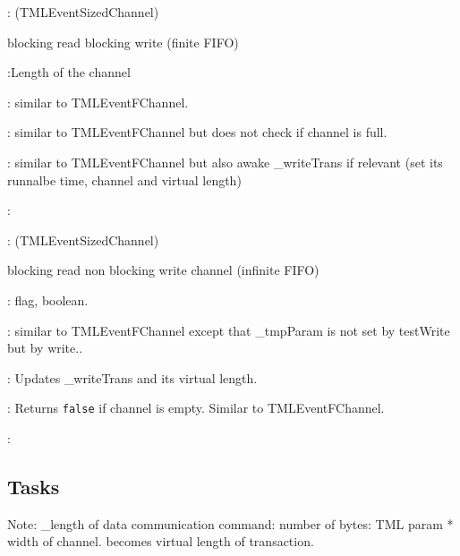 \documentclass[a4paper,11pt]{article}
\newcommand{\bfont}{\fontseries{b}\selectfont}
\newcommand{\cod}[1]{{\ttfamily #1}}
\newcommand{\class}[2]{\par\vspace{1mm}\hspace{-5mm}\large\colorbox{file}{\textbullet\bfont\cod{#1}:} (\cod{#2})\par}
\newcommand{\method}[1]{\par\vspace{1mm}\hspace{-2mm}\colorbox{method}{\textopenbullet\bfont\cod{#1}:}}
\newcommand{\variable}[1]{\par\vspace{1mm}\hspace{-2mm}\colorbox{variable}{\textopenbullet\bfont\cod{#1}:}}
\begin{document}
\class{TMLEventFBChannel}{TMLEventSizedChannel}
blocking read blocking write (finite FIFO)
\variable{\_length}Length of the channel
\method{testRead(), testWrite(), cancelReadTransaction()} similar to \cod{TMLEventFChan\-nel}.
\method{write()} similar to \cod{TMLEventFChannel} but does not check if channel is full.
\method{read()} similar to \cod{TMLEventFChannel} but also awake \cod{\_writeTrans} if relevant (set its runnalbe time, channel and virtual length)
\method{getBlockedReadTask(),getBlockedWriteTask()}

\class{TMLEventBChannel}{TMLEventSizedChannel}
blocking read non blocking write channel (infinite FIFO)
\variable{\_requestChannel} flag, boolean.
\method{testRead(), write()} similar to \cod{TMLEventFChannel} except that \cod{\_tmpParam} is not set by \cod{testWrite} but by \cod{write}..
\method{testWrite()} Updates \cod{\_writeTrans} and its virtual length.
\method{read()} Returns {\tt false} if channel is empty. Similar to \cod{TMLEventFChannel}.
\method{getBlockedReadTask(),getBlockedWriteTask()}

\subsection*{Tasks}
Note:
\cod{\_length} of data communication command: number of bytes: TML param * width of channel. becomes virtual length of transaction.
\end{document}
